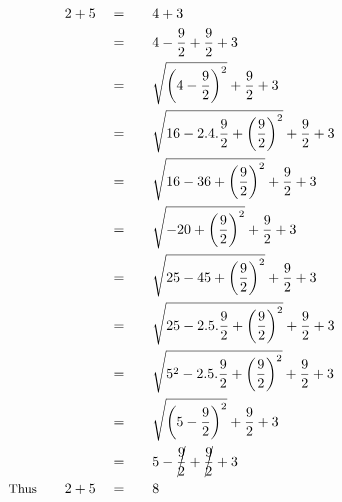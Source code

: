 \begin{alignat*}{5}
&\,&2+5\quad&=\quad&&4+3\\
&\,&\,&=&&4-\frac{9}{2}+\frac{9}{2}+3\\
&\,&\,&=&&\sqrt{\left(4-\frac{9}{2}\right)^2}+\frac{9}{2}+3\\
&\,&\,&=&&\sqrt{16-2.4.\frac{9}{2}+\left(\frac{9}{2}\right)^2}+\frac{9}{2}+3\\
&\,&\,&=&&\sqrt{16-36+\left(\frac{9}{2}\right)^2}+\frac{9}{2}+3\\
&\,&\,&=&&\sqrt{-20+\left(\frac{9}{2}\right)^2}+\frac{9}{2}+3\\
&\,&\,&=&&\sqrt{25-45+\left(\frac{9}{2}\right)^2}+\frac{9}{2}+3\\
&\,&\,&=&&\sqrt{25-2.5.\frac{9}{2}+\left(\frac{9}{2}\right)^2}+\frac{9}{2}+3\\
&\,&\,&=&&\sqrt{5^2-2.5.\frac{9}{2}+\left(\frac{9}{2}\right)^2}+\frac{9}{2}+3\\
&\,&\,&=&&\sqrt{\left(5-\frac{9}{2}\right)^2}+\frac{9}{2}+3\\
&\,&\,&=&&5-\cancel{\frac{9}{2}}+\cancel{\frac{9}{2}}+3\\
&\small\text{Thus}\normalsize\quad&2+5\quad&=&&8
\end{alignat*}
